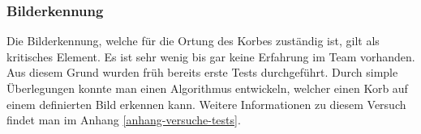 \subsubsection{Bilderkennung}
Die Bilderkennung, welche für die Ortung des Korbes zuständig ist, gilt als kritisches Element. Es ist sehr wenig bis gar keine Erfahrung im Team vorhanden. Aus diesem Grund wurden früh bereits erste Tests durchgeführt. Durch simple Überlegungen konnte man einen Algorithmus entwickeln, welcher einen Korb auf einem definierten Bild erkennen kann. Weitere Informationen zu diesem Versuch findet man im Anhang \ref{anhang-versuche-tests}.